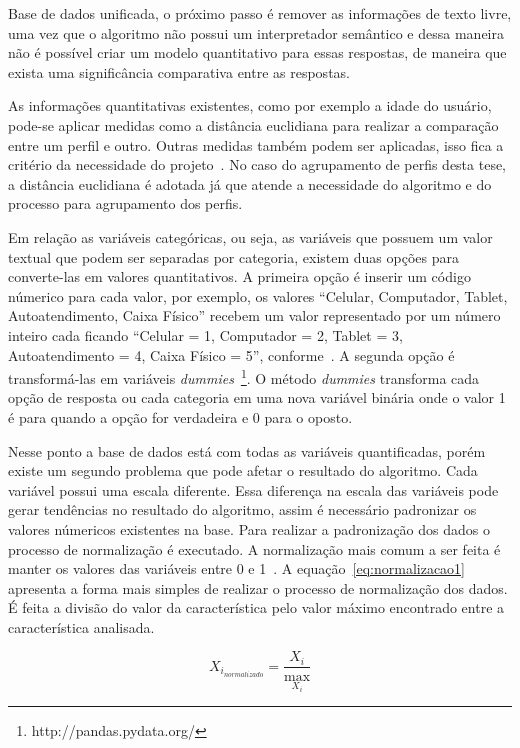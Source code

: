 Base de dados unificada, o próximo passo é remover as informações de texto livre, uma vez que o algoritmo não possui um interpretador semântico e dessa maneira não é possível criar um modelo quantitativo para essas respostas, de maneira que exista uma significância comparativa entre as respostas.

As informações quantitativas existentes, como por exemplo a idade do usuário, pode-se aplicar medidas como a distância euclidiana para realizar a comparação entre um perfil e outro. Outras medidas também podem ser aplicadas, isso fica a critério da necessidade do projeto~\cite{masiero:2013}. No caso do agrupamento de perfis desta tese, a distância euclidiana é adotada já que atende a necessidade do algoritmo e do processo para agrupamento dos perfis.

Em relação as variáveis categóricas, ou seja, as variáveis que possuem um valor textual que podem ser separadas por categoria, existem duas opções para converte-las em valores quantitativos. A primeira opção é inserir um código númerico para cada valor, por exemplo, os valores ``Celular, Computador, Tablet, Autoatendimento, Caixa Físico'' recebem um valor representado por um número inteiro cada ficando ``Celular = 1, Computador = 2, Tablet = 3, Autoatendimento = 4, Caixa Físico = 5'', conforme~. A segunda opção é transformá-las em variáveis \emph{dummies}~\footnote{http://pandas.pydata.org/}. O método \emph{dummies} transforma cada opção de resposta ou cada categoria em uma nova variável binária onde o valor 1 é para quando a opção for verdadeira e 0 para o oposto.

Nesse ponto a base de dados está com todas as variáveis quantificadas, porém existe um segundo problema que pode afetar o resultado do algoritmo. Cada variável possui uma escala diferente. Essa diferença na escala das variáveis pode gerar tendências no resultado do algoritmo, assim é necessário padronizar os valores númericos existentes na base. Para realizar a padronização dos dados o processo de normalização é executado. A normalização mais comum a ser feita é manter os valores das variáveis entre 0 e 1~\cite{lattin:2011}. A equação~\ref{eq:normalizacao1} apresenta a forma mais simples de realizar o processo de normalização dos dados. É feita a divisão do valor da característica pelo valor máximo encontrado entre a característica analisada.

\begin{equation}
	X_{i_{normalizado}} = \frac{X_i}{\max_{X_i}}
	\label{eq:normalizacao1}
\end{equation}

